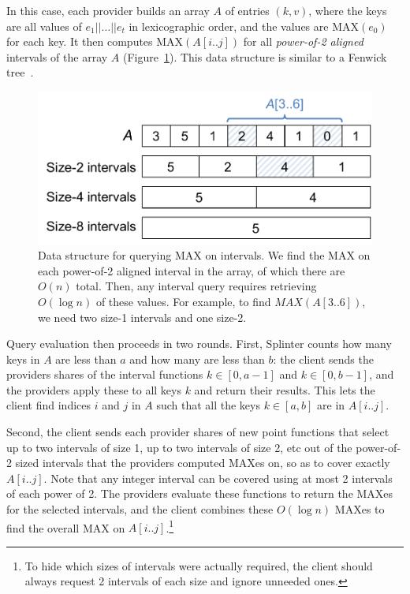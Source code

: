 In this case, each provider builds an array $A$ of entries $(k,v)$, where the keys are all
values of $e_1||\dots||e_t$ in lexicographic order, and the values are $\mathrm{MAX}(e_0)$
for each key.
It then computes $\mathrm{MAX}(A[i..j])$ for all \emph{power-of-2 aligned} intervals
of the array $A$ (Figure~\ref{fig:complex-max-tree}).
This data structure is similar to a Fenwick tree~\cite{fenwick-trees}.


\begin{figure}
	\centering
	\includegraphics[width=\textwidth]{splinter-figs/complex_max_tree.pdf}
	\caption[Data structure for querying MAX on intervals.]{Data structure for querying MAX on intervals.
		We find the MAX on each power-of-2 aligned interval in the array,
		of which there are $O(n)$ total.
		Then, any interval query requires retrieving $O(\log n)$ of these
		values. For example, to find $MAX(A[3..6])$, we need two
		size-1 intervals and one size-2.
	}
	\label{fig:complex-max-tree}
\end{figure}

Query evaluation then proceeds in two rounds.
First, Splinter counts how many keys in $A$ are less than $a$ and how many are less than
$b$: the client sends the providers shares of the interval functions
$k \in [0,a-1]$ and $k \in [0,b-1]$, and the providers apply these to all keys $k$
and return their results.
This lets the client find indices $i$ and $j$ in $A$
such that all the keys $k \in [a,b]$ are in $A[i..j]$.

Second, the client sends each provider shares of new point functions that select
up to two intervals of size 1, up to two intervals of size 2, etc out of the
power-of-2 sized intervals that the providers computed MAXes on, so as to cover
exactly $A[i..j]$.
Note that any integer interval can be covered using at most 2 intervals of each power of 2.
The providers evaluate these functions to return the MAXes for the selected intervals,
and the client combines these $O(\log n)$ MAXes to find the overall MAX on $A[i..j]$.\footnote{
	To hide which sizes of intervals were actually required, the client should always request 2 intervals
	of each size and ignore unneeded ones.
}

